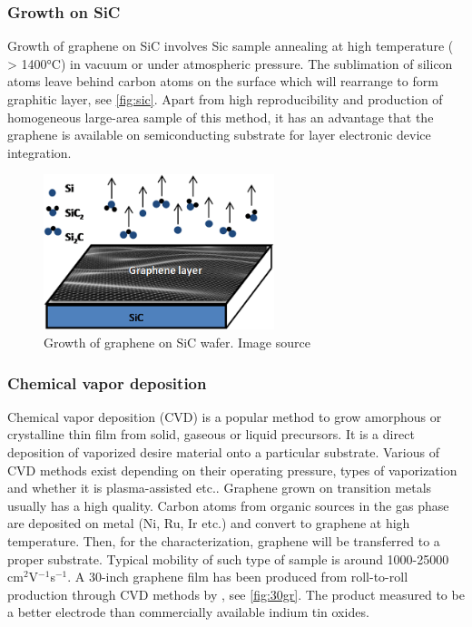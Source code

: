 \subsubsection{Growth on SiC}

Growth of graphene on SiC involves Sic sample annealing at high temperature ( > 1400\si{\celsius}) in vacuum or under atmospheric pressure. The sublimation of silicon atoms leave behind carbon atoms on the surface which will rearrange to form graphitic layer\cite{Mishra2016}, see \autoref{fig:sic}. Apart from high reproducibility and production of homogeneous large-area sample of this method, it has an advantage that the graphene is available on semiconducting substrate for layer electronic device integration. 

\begin{figure}[htbp!] 
\centering  
\includegraphics[width=0.6\textwidth]{gr-sic.png}
\caption{Growth of graphene on SiC wafer. Image source \cite{mishra2016graphene}}  
\label{fig:sic}
\end{figure} 

\subsubsection{Chemical vapor deposition}

Chemical vapor deposition (CVD) is a popular method to grow amorphous or crystalline thin film from solid, gaseous or liquid precursors. It is a direct deposition of vaporized desire material onto a particular substrate. Various of CVD methods exist depending on their operating pressure, types of vaporization and whether it is plasma-assisted etc.. Graphene grown on transition metals usually has a high quality. Carbon atoms from organic sources in the gas phase are deposited on metal (Ni, Ru, Ir etc.) and convert to graphene at high temperature. Then, for the characterization, graphene will be transferred to a proper substrate. Typical mobility of such type of sample is around 1000-25000 cm$^2$V$^{-1}$s$^{-1}$\cite{Petrone2012}. A 30-inch graphene film has been produced from roll-to-roll production through CVD methods by \citet{Bae2010}, see \autoref{fig:30gr}. The product measured to be a better electrode than commercially available indium tin oxides.

